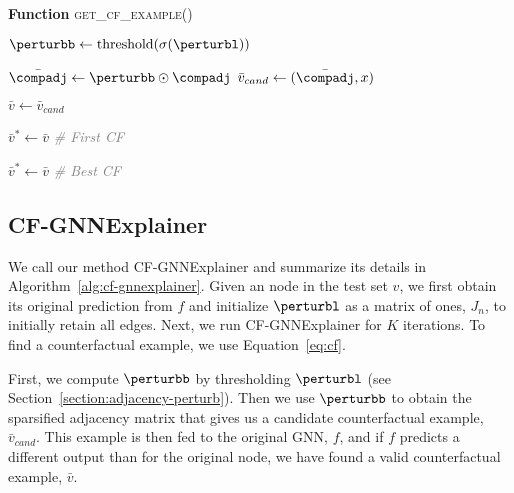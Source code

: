 \begin{algorithm}[t]
\begin{algorithmic}
        \STATE

        \STATE \textbf{Function} \textsc{get\_cf\_example()}
        
       \bindent
        
        \STATE $\perturbb \gets \text{threshold}(\sigma(\perturbl))$
        
        \STATE $\bar{\compadj} \gets \perturbb \odot \compadj$
        \STATE $\bar{v}_{cand} \gets (\bar{\compadj}, x)$
        
            \STATE $\bar{v} \gets \bar{v}_{cand}$
            
            	\STATE $\bar{v}^* \gets \bar{v}$ \qquad \textcolor{gray}{\textit{\# First CF}} 
            
            
                \STATE $\bar{v}^* \gets \bar{v}$ \qquad \textcolor{gray}{\textit{\# Best CF}} 
            \ENDIF
                    
        \ENDIF
        
        
        \eindent
        
        
        
    \end{algorithmic}
\end{algorithm}

\subsection{CF-GNNExplainer }

We call our method CF-GNNExplainer and summarize its details in Algorithm~\ref{alg:cf-gnnexplainer}. 
Given an node in the test set $v$, we first obtain its original prediction from $f$ and initialize ${\perturbl}$ as a matrix of ones, $J_n$, to initially retain all edges. 
Next, we run CF-GNNExplainer for $K$ iterations.  
To find a counterfactual example, we use Equation~\ref{eq:cf}. 

First, we compute $\perturbb$ by thresholding $\perturbl$ (see Section~\ref{section:adjacency-perturb}). 
Then we use $\perturbb$ to obtain the sparsified adjacency matrix that gives us a candidate counterfactual example, $\bar{v}_{cand}$. 
This example is then fed to the original GNN, $f$, and if $f$ predicts a different output than for the original node, we have found a valid counterfactual example, $\bar{v}$. 

